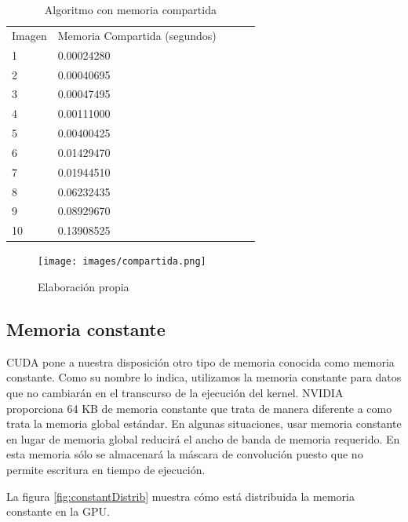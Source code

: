 \documentclass[10pt,journal,compsoc]{IEEEtran}
\begin{document}
\begin{table}[ht]
\centering
\caption{Algoritmo con memoria compartida}
\label{tab:compartida}
\begin{tabular}{lllll}
Imagen & Memoria Compartida (segundos) &  &  &  \\
1      & 0.00024280                    &  &  &  \\
2      & 0.00040695                    &  &  &  \\
3      & 0.00047495                    &  &  &  \\
4      & 0.00111000                    &  &  &  \\
5      & 0.00400425                    &  &  &  \\
6      & 0.01429470                    &  &  &  \\
7      & 0.01944510                    &  &  &  \\
8      & 0.06232435                    &  &  &  \\
9      & 0.08929670                    &  &  &  \\
10     & 0.13908525                    &  &  & 
\end{tabular}
\end{table}

\begin{figure}[ht]
    \begin{center}
        \texttt{[image: images/compartida.png]}
    \end{center}
    \caption{Elaboración propia}
\end{figure}


\subsection{Memoria constante}

CUDA pone a nuestra disposición otro tipo de memoria conocida como memoria constante. Como su nombre lo indica, utilizamos la memoria constante para datos que no cambiarán en el transcurso de la ejecución del kernel. NVIDIA proporciona 64 KB de memoria constante que trata de manera diferente a como trata la memoria global estándar. En algunas situaciones, usar memoria constante en lugar de memoria global reducirá el ancho de banda de memoria requerido. En esta memoria sólo se almacenará la máscara de convolución puesto que no permite escritura en tiempo de ejecución\cite{constantMemory}.

La figura \ref{fig:constantDistrib} muestra cómo está distribuida la memoria constante en la GPU.
\end{document}
